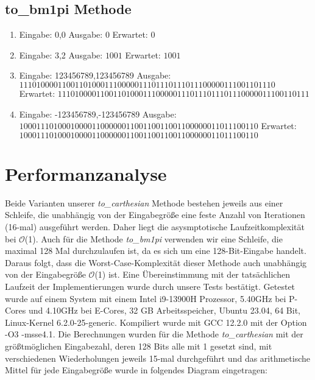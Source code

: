 \documentclass[course=erap]{aspdoc}
\begin{document}
    \subsection{to\_bm1pi Methode}
    \begin{enumerate}[label=\roman*)]
        \item Eingabe: 0,0 \quad  Ausgabe: $0$ \quad Erwartet: $0$
        \item Eingabe: 3,2 \quad Ausgabe: $1001$ \quad Erwartet: $1001$
        \item Eingabe: 123456789,123456789 \newline Ausgabe: $111010000110011010001110000011101110111011100000111001101110$
        \newline Erwartet: $11101000011001101000111000001110111011101110000011100110111$

        \item Eingabe: -123456789,-123456789 \newline Ausgabe: $10001110100010000110000001100110011001100000011011100110$
        \newline Erwartet:
        $10001110100010000110000001100110011001100000011011100110$
    \end{enumerate}


    \section{Performanzanalyse}
    Beide Varianten unserer \textit{to\_carthesian} Methode bestehen jeweils aus einer Schleife, die unabhängig von der Eingabegröße eine feste Anzahl von Iterationen (16-mal) ausgeführt werden.
    Daher liegt die asysmptotische Laufzeitkomplexität bei \( \mathcal{O} \)(1).
    Auch für die Methode \textit{to\_bm1pi }verwenden wir eine Schleife, die maximal 128 Mal durchzulaufen ist, da es sich um eine 128-Bit-Eingabe handelt.
    Daraus folgt, dass die Worst-Case-Komplexität dieser Methode auch unabhängig von der Eingabegröße \( \mathcal{O} \)(1) ist.
    Eine Übereinstimmung mit der tatsächlichen Laufzeit der Implementierungen wurde durch unsere Tests bestätigt.
    \vspace{10pt} \newline
    Getestet wurde auf einem System mit einem Intel i9-13900H Prozessor, 5.40GHz bei P-Cores und 4.10GHz bei E-Cores, 32 GB Arbeitsspeicher, Ubuntu 23.04, 64 Bit, Linux-Kernel 6.2.0-25-generic.
    Kompiliert wurde mit GCC 12.2.0 mit der Option -O3 -msse4.1.
    Die Berechnungen wurden für die Methode \textit{to\_carthesian} mit der größtmöglichen Eingabezahl, deren 128 Bits alle mit 1 gesetzt sind, mit verschiedenen Wiederholungen jeweils 15-mal durchgeführt und das arithmetische Mittel für jede Eingabegröße wurde in folgendes Diagram eingetragen:
    \vspace{10pt}
\end{document}
